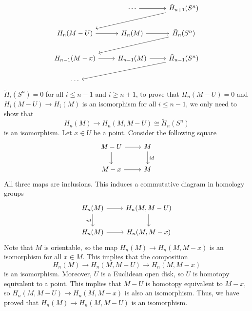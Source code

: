 \documentclass[letterpaper, 12pt]{article}
\begin{document}
\begin{solution}
\begin{enumerate}[(a)]
\[\begin{tikzcd}
	& \cdots & {\tilde{H}_{n+1}(S^n)} \\
	{H_n(M-U)} & {H_n(M)} & {\tilde{H}_n(S^n)} \\
	{H_{n-1}(M-x)} & {H_{n-1}(M)} & {\tilde{H}_{n-1}(S^n)} \\
	\cdots
	\arrow[from=1-2, to=1-3]
	\arrow[from=1-3, to=2-1]
	\arrow[from=2-1, to=2-2]
	\arrow[from=2-2, to=2-3]
	\arrow[from=2-3, to=3-1]
	\arrow[from=3-1, to=3-2]
	\arrow[from=3-2, to=3-3]
	\arrow[from=3-3, to=4-1]
\end{tikzcd}\]
\(\tilde{H}_i(S^n)=0\) for all \(i\leq n-1\) and \(i\geq n+1\), to prove that \(H_n(M-U)=0\) and \(H_i(M-U)\rightarrow H_i(M)\) is an isomorphism for all \(i\leq n-1\), we only need to show that 
\[H_n(M)\rightarrow H_n(M,M-U)\cong \tilde{H}_n(S^n)\]
is an isomorphism. Let \(x\in U\) be a point. Consider the following square 
\[\begin{tikzcd}
	{M-U} & M \\
	{M-x} & M
	\arrow[from=1-1, to=1-2]
	\arrow[from=1-1, to=2-1]
	\arrow["id", from=1-2, to=2-2]
	\arrow[from=2-1, to=2-2]
\end{tikzcd}\]
All three maps are inclusions. This induces a commutative diagram in homology groups 
\[\begin{tikzcd}
	{H_n(M)} & {H_n(M,M-U)} \\
	{H_n(M)} & {H_n(M,M-x)}
	\arrow[from=1-1, to=1-2]
	\arrow["id"', from=1-1, to=2-1]
	\arrow[from=1-2, to=2-2]
	\arrow[from=2-1, to=2-2]
\end{tikzcd}\]
Note that \(M\) is orientable, so the map \(H_n(M)\rightarrow H_n(M,M-x)\) is an isomorphism for all \(x\in M\). This implies that the composition 
\[H_n(M)\rightarrow H_n(M,M-U)\rightarrow H_n(M,M-x)\]
is an isomorphism. Moreover, \(U\) is a Euclidean open disk, so \(U\) is homotopy equivalent to a point. This implies that \(M-U\) is homotopy equivalent to \(M-x\), so \(H_n(M,M-U)\rightarrow H_n(M,M-x)\) is also an isomorphism. Thus, we have proved that \(H_n(M)\rightarrow H_n(M,M-U)\) is an isomorphism. 


\end{enumerate}
\end{solution}
\end{document}
